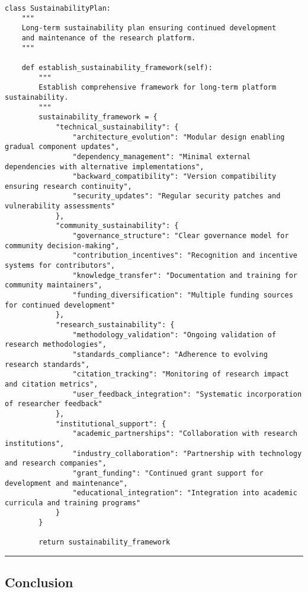 \documentclass[11pt,a4paper]{article}
\begin{document}
\begin{verbatim}
class SustainabilityPlan:
    """
    Long-term sustainability plan ensuring continued development
    and maintenance of the research platform.
    """

    def establish_sustainability_framework(self):
        """
        Establish comprehensive framework for long-term platform sustainability.
        """
        sustainability_framework = {
            "technical_sustainability": {
                "architecture_evolution": "Modular design enabling gradual component updates",
                "dependency_management": "Minimal external dependencies with alternative implementations",
                "backward_compatibility": "Version compatibility ensuring research continuity",
                "security_updates": "Regular security patches and vulnerability assessments"
            },
            "community_sustainability": {
                "governance_structure": "Clear governance model for community decision-making",
                "contribution_incentives": "Recognition and incentive systems for contributors",
                "knowledge_transfer": "Documentation and training for community maintainers",
                "funding_diversification": "Multiple funding sources for continued development"
            },
            "research_sustainability": {
                "methodology_validation": "Ongoing validation of research methodologies",
                "standards_compliance": "Adherence to evolving research standards",
                "citation_tracking": "Monitoring of research impact and citation metrics",
                "user_feedback_integration": "Systematic incorporation of researcher feedback"
            },
            "institutional_support": {
                "academic_partnerships": "Collaboration with research institutions",
                "industry_collaboration": "Partnership with technology and research companies",
                "grant_funding": "Continued grant support for development and maintenance",
                "educational_integration": "Integration into academic curricula and training programs"
            }
        }

        return sustainability_framework
\end{verbatim}

\hrule

\subsection{Conclusion}
\end{document}
